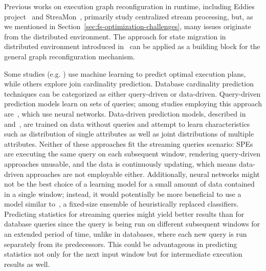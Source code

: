 Previous works on execution graph reconfiguration in runtime, including Eddies project~\cite{10.1145/335191.335420} and StreaMon~\cite{10.1145/1007568.1007702}, primarily study centralized stream processing, but, as we mentioned in Section~\ref{sec:fs-optimization-challenges}, many issues originate from the distributed environment. The approach for state migration in distributed environment introduced in~\cite{10.14778/3329772.3329777} can be applied as a building block for the general graph reconfiguration mechanism.

Some studies (e.g. \cite{krishnan2018learning, marcus2019neo}) use machine learning to predict optimal execution plans, while others explore join cardinality prediction. Database cardinality prediction techniques can be categorized as either query-driven or data-driven. Query-driven prediction models learn on sets of queries; among studies employing this approach are~\cite{liu2015cardinality, CHEN20211047, kipf2018learned, ortiz2019empirical}, which use neural networks. Data-driven prediction models, described in~\cite{hilprecht2020deepdb} and~\cite{yang2020neurocard}, are trained on data without queries and attempt to learn characteristics such as distribution of single attributes as well as joint distributions of multiple attributes. Neither of these approaches fit the streaming queries scenario: SPEs are executing the same query on each subsequent window, rendering query-driven approaches unusable, and the data is continuously updating, which means data-driven approaches are not employable either. Additionally, neural networks might not be the best choice of a learning model for a small amount of data contained in a single window; instead, it would potentially be more beneficial to use a model similar to~\cite{street2001ensemble}, a fixed-size ensemble of heuristically replaced classifiers. Predicting statistics for streaming queries might yield better results than for database queries since the query is being run on different subsequent windows for an extended period of time, unlike in databases, where each new query is run separately from its predecessors. This could be advantageous in predicting statistics not only for the next input window but for intermediate execution results as well.




